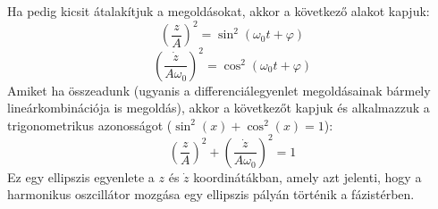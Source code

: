 \documentclass[../main.tex]{subfiles}
\begin{document}
Ha pedig kicsit átalakítjuk a megoldásokat, akkor a következő alakot kapjuk:
\begin{equation}
    (\frac{z}{A})^2 = \sin^2(\omega_0 t + \varphi)
\end{equation}
\begin{equation}
    (\frac{\dot{z}}{A\omega_0})^2 = \cos^2(\omega_0 t + \varphi)
\end{equation}
Amiket ha összeadunk (ugyanis a differenciálegyenlet megoldásainak bármely lineárkombinációja is megoldás), akkor a következőt kapjuk és alkalmazzuk a trigonometrikus azonosságot ($\sin^2(x) + \cos^2(x) = 1$):
\begin{equation}
    (\frac{z}{A})^2 + (\frac{\dot{z}}{A\omega_0})^2 = 1
\end{equation}
Ez egy ellipszis egyenlete a $z$ és $\dot{z}$ koordinátákban, amely azt jelenti, hogy a harmonikus oszcillátor mozgása egy ellipszis pályán történik a fázistérben.
\end{document}
